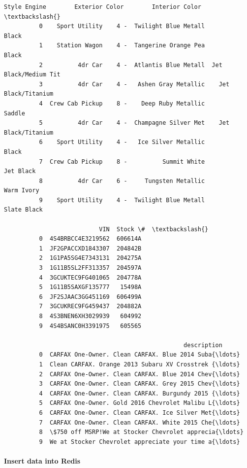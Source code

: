 \documentclass[11pt]{article}
\begin{document}
\begin{Verbatim}[commandchars=\\\{\}]
                       Style Engine        Exterior Color        Interior Color  \textbackslash{}
          0    Sport Utility    4 -  Twilight Blue Metall                 Black   
          1    Station Wagon    4 -  Tangerine Orange Pea                 Black   
          2          4dr Car    4 -  Atlantis Blue Metall  Jet Black/Medium Tit   
          3          4dr Car    4 -   Ashen Gray Metallic    Jet Black/Titanium   
          4  Crew Cab Pickup    8 -    Deep Ruby Metallic                Saddle   
          5          4dr Car    4 -  Champagne Silver Met    Jet Black/Titanium   
          6    Sport Utility    4 -   Ice Silver Metallic                 Black   
          7  Crew Cab Pickup    8 -          Summit White             Jet Black   
          8          4dr Car    6 -     Tungsten Metallic            Warm Ivory   
          9    Sport Utility    4 -  Twilight Blue Metall           Slate Black   
          
                           VIN  Stock \#  \textbackslash{}
          0  4S4BRBCC4E3219562  606614A   
          1  JF2GPACCXD1843307  204842B   
          2  1G1PA5SG4E7343131  204275A   
          3  1G11B5SL2FF313357  204597A   
          4  3GCUKTEC9FG401065  204778A   
          5  1G11B5SAXGF135777   15498A   
          6  JF2SJAAC3GG451169  606499A   
          7  3GCUKREC9FG459437  204882A   
          8  4S3BNEN6XH3029939   604992   
          9  4S4BSANC0H3391975   605565   
          
                                                   description  
          0  CARFAX One-Owner. Clean CARFAX. Blue 2014 Suba{\ldots}  
          1  Clean CARFAX. Orange 2013 Subaru XV Crosstrek {\ldots}  
          2  CARFAX One-Owner. Clean CARFAX. Blue 2014 Chev{\ldots}  
          3  CARFAX One-Owner. Clean CARFAX. Grey 2015 Chev{\ldots}  
          4  CARFAX One-Owner. Clean CARFAX. Burgundy 2015 {\ldots}  
          5  CARFAX One-Owner. Gold 2016 Chevrolet Malibu L{\ldots}  
          6  CARFAX One-Owner. Clean CARFAX. Ice Silver Met{\ldots}  
          7  CARFAX One-Owner. Clean CARFAX. White 2015 Che{\ldots}  
          8  \$750 off MSRP!We at Stocker Chevrolet apprecia{\ldots}  
          9  We at Stocker Chevrolet appreciate your time a{\ldots}  
\end{Verbatim}
            
            
            
    \paragraph{Insert data into Redis}\label{insert-data-into-redis}
\end{document}

